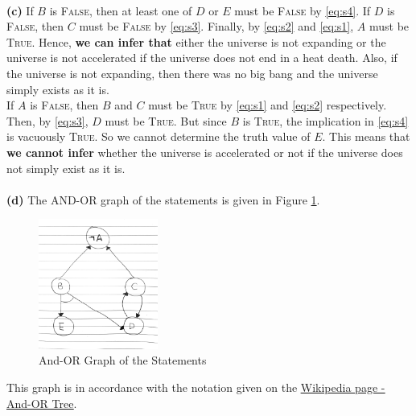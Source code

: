 \documentclass[12pt]{article}
\begin{document}
    \vspace*{0pt} \\
    \textbf{(c)}
    If $B$ is \textsc{False}, then at least one of $D$ or $E$ must be \textsc{False} by \eqref{eq:s4}. If $D$ is \textsc{False}, then $C$ must be \textsc{False}
    by \eqref{eq:s3}. Finally, by \eqref{eq:s2} and \eqref{eq:s1}, $A$ must be \textsc{True}. Hence, \textbf{we can infer that}
    either the universe is not expanding or the universe is not accelerated if the universe does not end in a heat death. Also,
    if the universe is not expanding, then there was no big bang and the universe simply exists as it is. \\
    If $A$ is \textsc{False}, then $B$ and $C$ must be \textsc{True} by \eqref{eq:s1} and \eqref{eq:s2} respectively. Then,
    by \eqref{eq:s3}, $D$ must be \textsc{True}. But since $B$ is \textsc{True}, the implication in \eqref{eq:s4} is vacuously
    \textsc{True}. So we cannot determine the truth value of $E$. This means that \textbf{we cannot infer} whether the universe
    is accelerated or not if the universe does not simply exist as it is. \\
    \vspace*{0pt} \\
    \textbf{(d)}
    The AND-OR graph of the statements is given in Figure \ref{fig:and-or}.
    \begin{figure}[htpb]
        \centering
        \includegraphics[width=0.35\textwidth]{Assets/and-or.jpg}
        \caption{And-OR Graph of the Statements}
        \label{fig:and-or}
    \end{figure}
    This graph is in accordance with the notation given on the
    \href{https://en.wikipedia.org/wiki/And%E2%80%93or_tree}{\underline{Wikipedia page - And-OR Tree}}.
\end{document}
